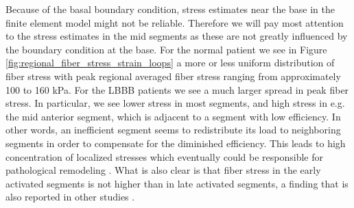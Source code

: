 Because of the basal boundary condition, stress estimates near the
base in the finite element model might not be reliable. Therefore we
will pay most attention to the stress 
estimates in the mid segments as these are not greatly influenced by
the boundary condition at the base. For the normal patient we see in
Figure \ref{fig:regional_fiber_stress_strain_loops} a
more or less uniform distribution of fiber stress with peak regional
averaged fiber
stress ranging from approximately 100 to 160 kPa. For the LBBB
patients we see a much larger spread in peak fiber stress. In
particular, we see lower stress in most segments, and high stress
in e.g. the mid anterior segment, which is adjacent to a segment with
low efficiency. In other words, an inefficient segment seems to
redistribute its load to neighboring segments in order to compensate
for the diminished efficiency. This leads to high concentration of
localized stresses which eventually could be responsible for pathological remodeling
\cite{grossman1975wall}. What is also clear is that fiber stress in the
early activated segments is not higher than in late activated
segments, a finding that is also reported in other studies
\cite{delhaas1994regional}. 






